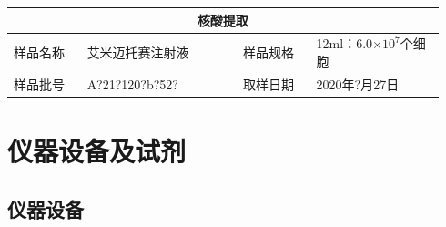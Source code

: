 \documentclass[UTF8,10pt,a4paper,fontset=fandol]{ctexart}
\newcommand{\fieldvalue}[1]{#1}
\newcommand{\handwritten}[1]{#1}
\begin{document}
\begin{center}
\begin{tabular}{|p{0.16\linewidth}|p{0.34\linewidth}|p{0.16\linewidth}|p{0.28\linewidth}|}
\hline
\multicolumn{4}{|c|}{核酸提取}\\
\hline
样品名称 &
\fieldvalue{艾米迈托赛注射液}
&
样品规格 &
\fieldvalue{12ml：6.0$\times 10^{7}$个细胞}\\
\hline
样品批号 &
\fieldvalue{\handwritten{A?21?120?b?52?}}
&
取样日期 &
\fieldvalue{\handwritten{2020年?月27日}}\\
\hline
\end{tabular}
\end{center}

\section{仪器设备及试剂}

\subsection{仪器设备}
\end{document}
